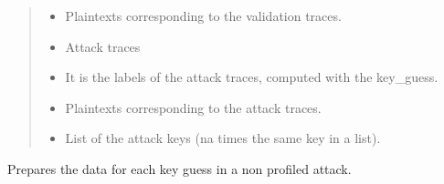 \documentclass[letterpaper,10pt,english]{sphinxmanual}
\begin{document}
\begin{fulllineitems}
\begin{fulllineitems}
\begin{quote}
\begin{description}
\begin{itemize}
\item {} 
\sphinxAtStartPar
{} \textendash{} Plaintexts corresponding to the validation traces.

\item {} 
\sphinxAtStartPar
{} \textendash{} Attack traces

\item {} 
\sphinxAtStartPar
{} \textendash{} It is the labels of the attack traces, computed with the key\_guess.

\item {} 
\sphinxAtStartPar
{} \textendash{} Plaintexts corresponding to the attack traces.

\item {} 
\sphinxAtStartPar
{} \textendash{} List of the attack keys (na times the same key in a list).

\end{itemize}


\end{description}\end{quote}

\end{fulllineitems}


\begin{fulllineitems}
\label{\detokenize{MLSCAlib.Data:MLSCAlib.Data.custom_manager.CustomDataManager.prepare_unprofiled_data}}
\pysigstartsignatures
{}
\pysigstopsignatures
\sphinxAtStartPar
Prepares the data for each key guess in a non profiled attack.


\end{fulllineitems}
\end{fulllineitems}
\end{document}
